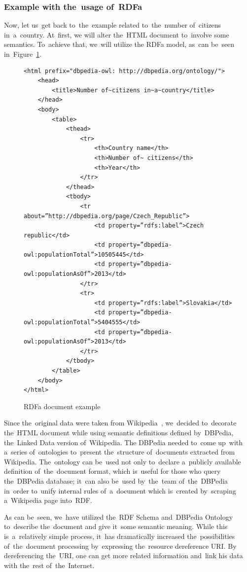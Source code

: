\subsubsection{Example with the~usage of~RDFa}

Now, let us~get back to~the~example related to~the~number of~citizens in~a~country. At~first, we
will alter the~HTML document to~involve some semantics. To~achieve that, we~will utilize the
RDFa model, as~can be~seen in~Figure~\ref{fig:example-rdfa}.

\begin{figure}
\scriptsize\begin{verbatim}
<html prefix="dbpedia-owl: http://dbpedia.org/ontology/">
    <head>
        <title>Number of~citizens in~a~country</title>
    </head>
    <body>
        <table>
            <thead>
                <tr>
                    <th>Country name</th>
                    <th>Number of~ citizens</th>
                    <th>Year</th>
                </tr>
            </thead>
            <tbody>
                <tr about=”http://dbpedia.org/page/Czech_Republic”>
                    <td property=”rdfs:label”>Czech republic</td>
                    <td property=”dbpedia-owl:populationTotal”>10505445</td>
                    <td property=”dbpedia-owl:populationAsOf”>2013</td>
                </tr>
                <tr>
                    <td property=”rdfs:label”>Slovakia</td>
                    <td property=”dbpedia-owl:populationTotal”>5404555</td>
                    <td property=”dbpedia-owl:populationAsOf”>2013</td>
                </tr>
            </tbody>
        </table>
    </body>
</html>
\end{verbatim}\normalsize
\caption{RDFa document example}
\label{fig:example-rdfa}
\end{figure}

Since the~original data were taken from Wikipedia~\cite{wikipedia}, we~decided to~decorate the~HTML document
while using semantic definitions defined by~DBPedia, the~Linked Data version of~Wikipedia. 
The DBPedia needed to~come up~with a~series of~ontologies to~present the~structure of~documents
extracted from Wikipedia. The~ontology can be~used not only to~declare a~publicly available definition of~the~document format, which is~useful for those who query the~DBPedia database; it~can also be~used by~the~team of~the~DBPedia in~order to~unify internal rules of~a~document which is~created by~scraping a~Wikipedia page into~RDF.

As can be~seen, we~have utilized the~RDF Schema and~DBPedia Ontology to~describe the~document
and give it~some semantic meaning. While this is~a~relatively simple process, it~has dramatically
increased the~possibilities of~the~document processing by~expressing the~resource dereference URI.
By dereferencing the~URI, one can get more related information and~link his data with the~rest
of~the~Internet.

